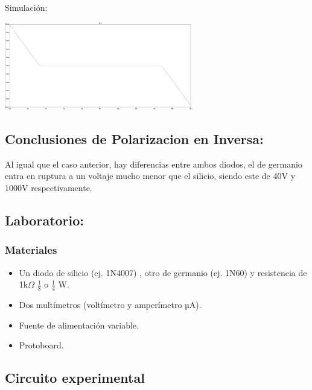 \vspace{0.5cm}

Simulación:

\includegraphics[width=8.2cm]{imagenes/simulacion4.png}\\

\subsection{Conclusiones de Polarizacion en Inversa:}

Al igual que el caso anterior, hay diferencias entre ambos diodos, el de germanio entra en ruptura a un voltaje mucho menor que el silicio, siendo este de 40V y 1000V respectivamente.


\subsection{Laboratorio:}

\subsubsection*{Materiales}

\begin{itemize}
    \item Un diodo de silicio (ej. 1N4007) , otro de germanio (ej. 1N60) y resistencia de 1k$\Omega$ $\frac{1}{8}$ o $\frac{1}{4}$ W.
    \item Dos multímetros (voltímetro y amperímetro µA).
    \item Fuente de alimentación variable.
    \item Protoboard.
\end{itemize}

\subsection*{Circuito experimental}

